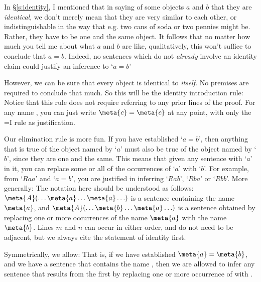 In \S\ref{s:identity}, I mentioned that in saying of some objects $a$ and $b$ that they are \emph{identical}, we don't merely mean that they are very similar to each other, or indistinguishable in the way that e.g. two cans of soda or two pennies might be. Rather, they have to be one and the same object. It follows that no matter how much you tell me about what  $a$ and $b$ are like, qualitatively, this won't suffice to conclude that $a=b$.  Indeed, no sentences which do not \emph{already} involve an identity claim could justify an inference to `$a=b$'


However, we can be sure that every object is identical to \emph{itself}. No premises are required to conclude that much. So this will be the identity introduction rule:
Notice that this rule does not require referring to any prior lines of the proof. For any name , you can just write $\meta{c}=\meta{c}$ at any point, with only the {=}I rule as justification. 


Our elimination rule is more fun. If you have established `$a=b$', then anything that is true of the object named by `$a$' must also be true of the object named by `$b$', since they are one and the same. This means that given any sentence with `$a$' in it, you can replace some or all of the occurrences of `$a$' with `$b$'. For example, from `$Raa$' and `$a = b$', you are justified in inferring `$Rab$', `$Rba$' or `$Rbb$'. More generally:
The notation here should be understood as follows: $\meta{A}(\ldots \meta{a} \ldots \meta{a}\ldots)$ is a sentence containing the name $\meta{a}$, and $\meta{A}(\ldots \meta{b} \ldots \meta{a}\ldots)$ is a sentence obtained by replacing one or more occurrences of the name $\meta{a}$ with the name $\meta{b}$. Lines $m$ and $n$ can occur in either order, and do not need to be adjacent, but we always cite the statement of identity first. 

Symmetrically, we allow:
That is, if we have established $\meta{a} = \meta{b}$, and we have a sentence that contains the name , then we are allowed to infer any sentence that results from the first by replacing one or more occurrence of  with .

